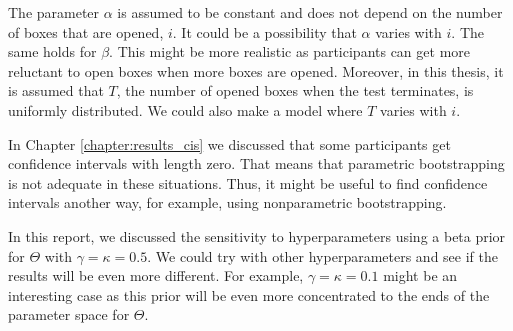 The parameter $\alpha$ is assumed to be constant and does not depend on the number of boxes that are opened, $i$. It could be a possibility that $\alpha$ varies with $i$. The same holds for $\beta$. This might be more realistic as participants can get more reluctant to open boxes when more boxes are opened.
Moreover, in this thesis, it is assumed that $T$, the number of opened boxes when the test terminates, is uniformly distributed. We could also make a model where $T$ varies with $i$. 

In Chapter \ref{chapter:results_cis} we discussed that some participants get confidence intervals with length zero. That means that parametric bootstrapping is not adequate in these situations. Thus, it might be useful to find confidence intervals another way, for example, using nonparametric bootstrapping. 

In this report, we discussed the sensitivity to hyperparameters using a beta prior for $\Theta$ with $\gamma=\kappa=0.5$. We could try with other hyperparameters and see if the results will be even more different. For example, $\gamma=\kappa=0.1$ might be an interesting case as this prior will be even more concentrated to the ends of the parameter space for $\Theta$. 


